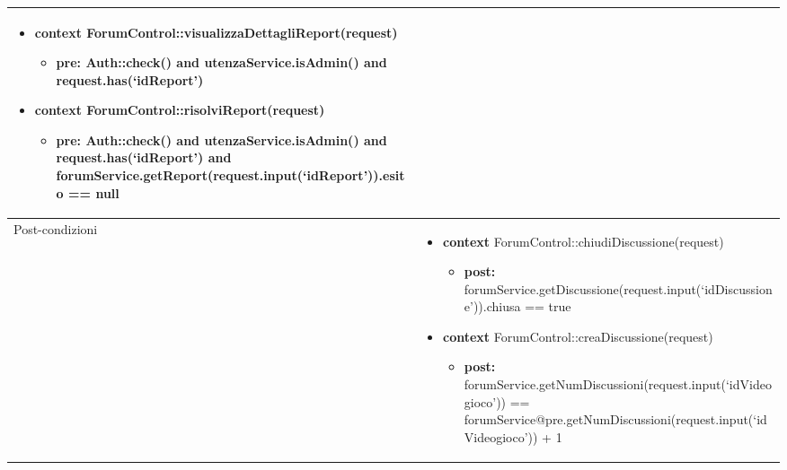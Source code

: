 \begin{tabular}{|| l | p{28em} ||}
\begin{itemize}[leftmargin=*]
	\item \textbf{context} ForumControl::visualizzaDettagliReport(request)
	\begin{itemize}
		\item[ ] \textbf{pre:} Auth::check() and utenzaService.isAdmin() and request.has(‘idReport’)
	\end{itemize}
	
	\item \textbf{context} ForumControl::risolviReport(request)
	\begin{itemize}
		\item[ ] \textbf{pre:} Auth::check() and utenzaService.isAdmin() and request.has(‘idReport’) and forumService.getReport(request.input(‘idReport’)).esito == null
	\end{itemize}
\end{itemize}\\
\hline
Post-condizioni & \begin{itemize}[leftmargin=*]
	\item \textbf{context} ForumControl::chiudiDiscussione(request)
	\begin{itemize}
		\item[ ] \textbf{post:} forumService.getDiscussione(request.input(‘idDiscussione’)).chiusa == true
	\end{itemize}

	\item \textbf{context} ForumControl::creaDiscussione(request)
	\begin{itemize}
		\item[ ] \textbf{post:} forumService.getNumDiscussioni(request.input(‘idVideogioco’)) == forumService@pre.getNumDiscussioni(request.input(‘idVideogioco’)) + 1
	\end{itemize}

\end{itemize}\\
\hline
\end{tabular}

\newpage
